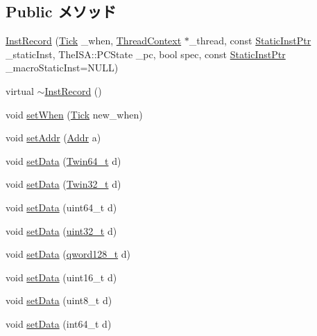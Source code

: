 \subsection*{Public メソッド}
\begin{DoxyCompactItemize}
\item 
\hyperlink{classTrace_1_1InstRecord_a700779baa07a708524e5742e47eca986}{InstRecord} (\hyperlink{base_2types_8hh_a5c8ed81b7d238c9083e1037ba6d61643}{Tick} \_\-when, \hyperlink{classThreadContext}{ThreadContext} $\ast$\_\-thread, const \hyperlink{classRefCountingPtr}{StaticInstPtr} \_\-staticInst, TheISA::PCState \_\-pc, bool spec, const \hyperlink{classRefCountingPtr}{StaticInstPtr} \_\-macroStaticInst=NULL)
\item 
virtual \hyperlink{classTrace_1_1InstRecord_a60ce54d76492633dd07a82c175a314c4}{$\sim$InstRecord} ()
\item 
void \hyperlink{classTrace_1_1InstRecord_aff946f7463b38f324046493d6e5d3e37}{setWhen} (\hyperlink{base_2types_8hh_a5c8ed81b7d238c9083e1037ba6d61643}{Tick} new\_\-when)
\item 
void \hyperlink{classTrace_1_1InstRecord_a0086c298c7423d3f7e571e9f63a1c09f}{setAddr} (\hyperlink{base_2types_8hh_af1bb03d6a4ee096394a6749f0a169232}{Addr} a)
\item 
void \hyperlink{classTrace_1_1InstRecord_a6e6b9d43995b55f7d6229fa14e832a4f}{setData} (\hyperlink{structm5__twin64__t}{Twin64\_\-t} d)
\item 
void \hyperlink{classTrace_1_1InstRecord_a70d2d7e1b7b8100ff4babc7e0024eb23}{setData} (\hyperlink{structm5__twin32__t}{Twin32\_\-t} d)
\item 
void \hyperlink{classTrace_1_1InstRecord_a103bbef2bd5d0e0957a6cfd398fcc4d4}{setData} (uint64\_\-t d)
\item 
void \hyperlink{classTrace_1_1InstRecord_aa59f8b2f6febc4041b5589292b9febff}{setData} (\hyperlink{Type_8hh_a435d1572bf3f880d55459d9805097f62}{uint32\_\-t} d)
\item 
void \hyperlink{classTrace_1_1InstRecord_ad815e14bea9095c2c12c659fe3db13f3}{setData} (\hyperlink{structqword128__t}{qword128\_\-t} d)
\item 
void \hyperlink{classTrace_1_1InstRecord_a5166a73856a875b0e426fdc95212937c}{setData} (uint16\_\-t d)
\item 
void \hyperlink{classTrace_1_1InstRecord_aa51cc6b27f5c0f81c58f5735506cd5a7}{setData} (uint8\_\-t d)
\item 
void \hyperlink{classTrace_1_1InstRecord_adda7b55a9bb38bf4027ec33e8bdc71bd}{setData} (int64\_\-t d)

\end{DoxyCompactItemize}
